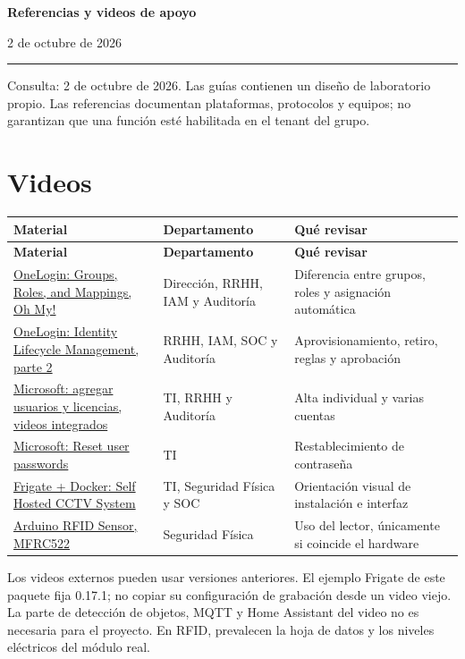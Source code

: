 \documentclass[12pt,a4paper]{article}
\begin{document}
{\LARGE\bfseries Referencias y videos de apoyo\par}\vspace{6pt}
2 de octubre de 2026\par\hrule\vspace{10pt}
Consulta: 2 de octubre de 2026. Las guías contienen un diseño de laboratorio propio. Las referencias documentan plataformas, protocolos y equipos; no garantizan que una función esté habilitada en el tenant del grupo.\par
{}\section*{Videos}
{\small\renewcommand{\arraystretch}{1.2}
\begin{longtable}{p{5.027cm}p{5.027cm}p{5.027cm}}
\toprule
\textbf{Material} & \textbf{Departamento} & \textbf{Qué revisar} \\ \midrule\endfirsthead
\textbf{Material} & \textbf{Departamento} & \textbf{Qué revisar} \\ \midrule\endhead
\href{https://www.onelogin.com/video/groups-roles-and-mappings-oh-my}{OneLogin: Groups, Roles, and Mappings, Oh My!} & Dirección, RRHH, IAM y Auditoría & Diferencia entre grupos, roles y asignación automática \\
\href{https://www.onelogin.com/resource-center/videos/getting-started-with-identity-lifecycle-management-pt-2}{OneLogin: Identity Lifecycle Management, parte 2} & RRHH, IAM, SOC y Auditoría & Aprovisionamiento, retiro, reglas y aprobación \\
\href{https://learn.microsoft.com/en-us/microsoft-365/admin/add-users/add-users?view=o365-worldwide}{Microsoft: agregar usuarios y licencias, videos integrados} & TI, RRHH y Auditoría & Alta individual y varias cuentas \\
\href{https://www.youtube.com/watch?v=8ShQqMZmhRg}{Microsoft: Reset user passwords} & TI & Restablecimiento de contraseña \\
\href{https://www.youtube.com/watch?v=KMD72_Wfp3E}{Frigate + Docker: Self Hosted CCTV System} & TI, Seguridad Física y SOC & Orientación visual de instalación e interfaz \\
\href{https://www.youtube.com/watch?v=CQLPo7xqORQ}{Arduino RFID Sensor, MFRC522} & Seguridad Física & Uso del lector, únicamente si coincide el hardware \\
\bottomrule\end{longtable}}
Los videos externos pueden usar versiones anteriores. El ejemplo Frigate de este paquete fija 0.17.1; no copiar su configuración de grabación desde un video viejo. La parte de detección de objetos, MQTT y Home Assistant del video no es necesaria para el proyecto. En RFID, prevalecen la hoja de datos y los niveles eléctricos del módulo real.\par
\end{document}
